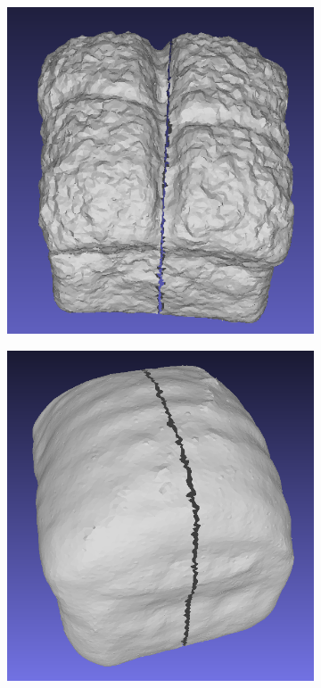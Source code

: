 \begin{figure}[ht]
    \centering
    \small
    \begin{subfigure}[b]{0.25\textwidth}
        \centering
        \includegraphics[width=\textwidth]{etc/technical/bread/magic3d_split.png}
        \caption{}
    \end{subfigure}
    \begin{subfigure}[b]{0.248\textwidth}
        \centering
        \includegraphics[width=\textwidth]{etc/technical/bread/magic123_split.png}

\end{subfigure}
\end{figure}
